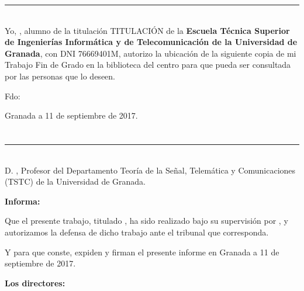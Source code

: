 \noindent\rule[-1ex]{\textwidth}{2pt}\\[4.5ex]

Yo, \textbf{\myName}, alumno de la titulación TITULACIÓN de la \textbf{Escuela Técnica Superior
de Ingenierías Informática y de Telecomunicación de la Universidad de Granada}, con DNI 76669401M, autorizo la
ubicación de la siguiente copia de mi Trabajo Fin de Grado en la biblioteca del centro para que pueda ser
consultada por las personas que lo deseen.

\vspace{6cm}

\noindent Fdo: \myName

\vspace{2cm}

\begin{flushright}
Granada a 11 de septiembre de 2017.
\end{flushright}


\chapter*{}
\thispagestyle{empty}

\noindent\rule[-1ex]{\textwidth}{2pt}\\[4.5ex]

D. \textbf{\myProf}, Profesor del Departamento Teoría de la Señal, Telemática y Comunicaciones (TSTC) de la Universidad de Granada.

\vspace{0.5cm}




\textbf{Informa:}

\vspace{0.5cm}

Que el presente trabajo, titulado \textit{\textbf{\myTitle}},
ha sido realizado bajo su supervisión por \textbf{\myName}, y autorizamos la defensa de dicho trabajo ante el tribunal
que corresponda.

\vspace{0.5cm}

Y para que conste, expiden y firman el presente informe en Granada a 11 de septiembre de 2017.

\vspace{1cm}

\textbf{Los directores:}

